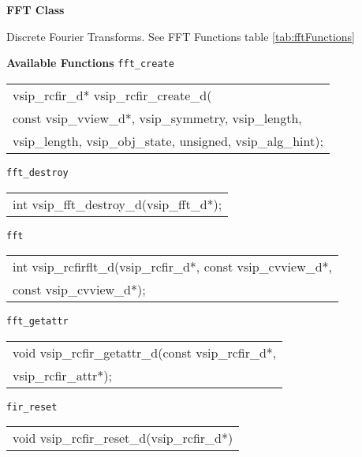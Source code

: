 \clearpage
{\large \textbf{\hypertarget{fftFunc}{FFT Class}}}\vspace{.2cm}\\
\hspace*{.3cm}
\parbox{0.85\textwidth}{Discrete Fourier Transforms. See FFT Functions table \ref{tab:fftFunctions}}
\cvsiplh 
\newline \hspace*{.8cm} \vspace*{.1cm} \textbf{Available Functions }
\newline \hspace*{.8cm} \vspace*{.1cm} \texttt{fft\_create}
\newline \hspace*{1.1cm} {
\ttfamily
\begin{tabular}[H]{l}
vsip\_rcfir\_d* vsip\_rcfir\_create\_d(\\*\hspace{.7cm}const vsip\_vview\_d*, vsip\_symmetry, vsip\_length,\\*\hspace{.7cm}vsip\_length, vsip\_obj\_state, unsigned, vsip\_alg\_hint);\\
\end{tabular}
}
\newline \hspace*{.8cm} \vspace*{.1cm} \texttt{fft\_destroy}
\newline \hspace*{1.1cm} {
\ttfamily
\begin{tabular}[H]{l}
int vsip\_fft\_destroy\_d(vsip\_fft\_d*);\\
\end{tabular}
}\vspace{.1cm}
\newline \hspace*{.8cm} \vspace*{.1cm} \texttt{fft}
\newline \hspace*{1.1cm} {
\ttfamily
\begin{tabular}[H]{l}
int vsip\_rcfirflt\_d(vsip\_rcfir\_d*, const vsip\_cvview\_d*,\\*\hspace{.7cm}const vsip\_cvview\_d*);\\
\end{tabular}
}
\clearpage
\hspace*{.8cm} \texttt{fft\_getattr}
\newline \hspace*{1.1cm} {
\ttfamily
\begin{tabular}[H]{l}
void vsip\_rcfir\_getattr\_d(const vsip\_rcfir\_d*,\\*\hspace{.7cm}vsip\_rcfir\_attr*);\\
\end{tabular}
}\vspace{.1cm}
\newline\hspace*{.8cm} \texttt{fir\_reset}
\newline \hspace*{1.1cm} {
\ttfamily
\begin{tabular}[H]{l}
void vsip\_rcfir\_reset\_d(vsip\_rcfir\_d*)\\
\end{tabular}\
}
\pyjvsiph
